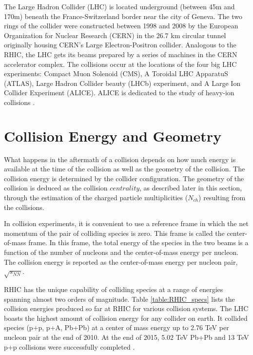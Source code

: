 The Large Hadron Collider (LHC) is located underground (between 45m and 170m) beneath the France-Switzerland border near the city of  Geneva. The two rings of the collider were constructed between 1998 and 2008 by the European Organization for Nuclear Research (CERN) in the 26.7 km circular tunnel originally housing CERN's Large Electron-Positron collider. Analogous to the RHIC, the LHC gets its beams prepared by a series of machines in the CERN accelerator complex. The collisions occur at the locations of the four big LHC experiments: Compact Muon Solenoid (CMS), A Toroidal LHC ApparatuS (ATLAS), Large Hadron Collider beauty (LHCb) experiment, and A Large Ion Collider Experiment (ALICE). ALICE is dedicated to the study of heavy-ion collisions \cite{1748-0221-3-08-S08001}.

\section{Collision Energy and Geometry}
What happens in the aftermath of a collision depends on how much energy is available at the time of the collision as well as the geometry of the collision. The collision energy is determined by the collider configuration. The geometry of the collision is deduced as the collision $centrality$, as described later in this section, through the estimation of the charged particle multiplicities ($N_{ch}$) resulting from the collisions.  

In collision experiments, it is convenient to use a reference frame in which the net momentum of the pair of colliding species is zero. This frame is called the center-of-mass frame. In this frame, the total energy of the species in the two beams is a function of the number of nucleons and the center-of-mass energy per nucleon. The collision energy is reported as the center-of-mass energy per nucleon pair, $\sqrt{s_{NN}}$. %


RHIC has the unique capability of colliding species at a range of energies spanning almost two orders of magnitude. Table \ref{table:RHIC_specs} lists the collision energies produced so far at RHIC for various collision systems. The LHC boasts the highest amount of collision energy for any collider on earth. It collided species (p+p, p+A, Pb+Pb) at a center of mass energy up to 2.76 TeV per nucleon pair at the end of 2010. At the end of 2015, 5.02 TeV Pb+Pb and 13 TeV p+p collisions were successfully completed \cite{FOKA2016154}.

